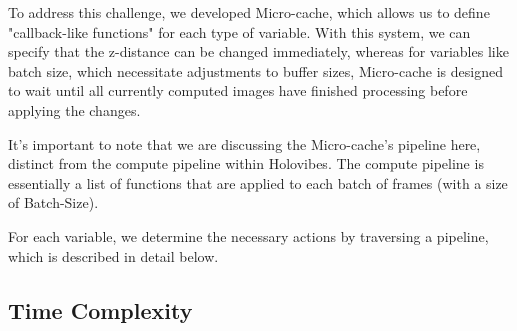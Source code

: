 To address this challenge, we developed Micro-cache, which allows us to define "callback-like functions" for each type of variable. With this system, we can specify that the z-distance can be changed immediately, whereas for variables like batch size, which necessitate adjustments to buffer sizes, Micro-cache is designed to wait until all currently computed images have finished processing before applying the changes.

It's important to note that we are discussing the Micro-cache's pipeline here, distinct from the compute pipeline within Holovibes. The compute pipeline is essentially a list of functions that are applied to each batch of frames (with a size of Batch-Size).

For each variable, we determine the necessary actions by traversing a pipeline, which is described in detail below.

\subsection{Time Complexity}
